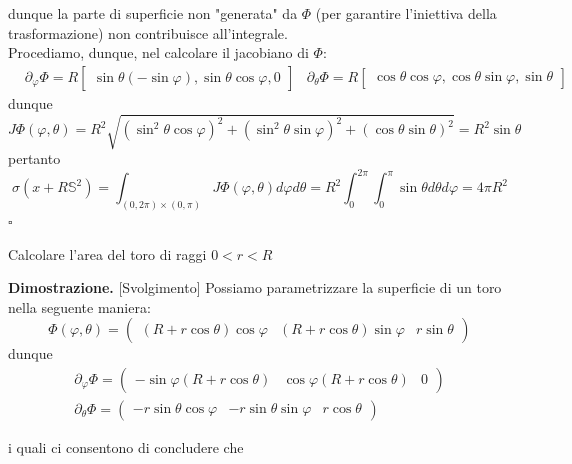 	dunque la parte di superficie non "generata" da $\Phi$ (per garantire l'iniettiva della trasformazione) non contribuisce all'integrale. \\
	Procediamo, dunque, nel calcolare il jacobiano di $\Phi$:
	\[\begin{aligned}
		&\partial_{\varphi} \Phi = R \begin{bmatrix} \sin{\theta} (-\sin{\varphi}), \sin{\theta} \cos{\varphi}, 0 \end{bmatrix}
		&\partial_{\theta} \Phi = R \begin{bmatrix} \cos{\theta} \cos{\varphi}, \cos{\theta} \sin{\varphi}, \sin{\theta} \end{bmatrix}
	\end{aligned}\]
	dunque
	$$
	J\Phi(\varphi, \theta) = R^2 \sqrt{(\sin^2{\theta} \cos{\varphi})^2 + (\sin^2{\theta} \sin{\varphi})^2 + (\cos{\theta} \sin{\theta})^2} = R^2 \sin{\theta}
	$$
	pertanto
	$$
	\sigma(x+R\mathbb{S}^2) = \int_{(0, 2\pi) \times (0, \pi)} J\Phi (\varphi, \theta) d\varphi d\theta = R^2 \int_0^{2\pi} \int_0^\pi \sin{\theta} d\theta d\varphi = 4 \pi R^2
	$$
\hfill $\square$
%
\vspace{0.5cm}
\begin{example}
	Calcolare l'area del toro di raggi $0 < r < R$
\end{example}
%
\noindent \textbf{Dimostrazione. }[Svolgimento]
	Possiamo parametrizzare la superficie di un toro nella seguente maniera:
	$$
	\Phi(\varphi, \theta) = \begin{pmatrix}	(R + r\cos{\theta})\cos{\varphi} & (R+r \cos{\theta})\sin{\varphi} & r \sin{\theta}		\end{pmatrix}
	$$
	dunque
	\[\begin{aligned}
	&\partial_\varphi \Phi = \begin{pmatrix} -\sin{\varphi}(R + r \cos{\theta}) & \cos{\varphi}(R + r \cos{\theta}) & 0\end{pmatrix} & \\
	&\partial_\theta \Phi = \begin{pmatrix} - r \sin{\theta} \cos{\varphi} & -r \sin{\theta} \sin{\varphi} & r\cos{\theta}	\end{pmatrix}
	\end{aligned}\]
	
	i quali ci consentono di concludere che
	

